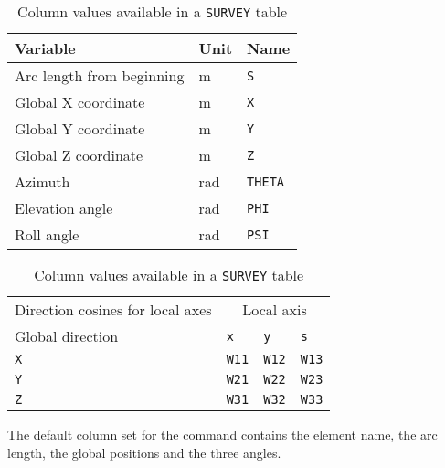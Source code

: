 \begin{table}[Ht] \footnotesize
  \begin{center}
    \caption{Column values available in a \texttt{SURVEY} table}
    \label{tab:survey_col}
    \begin{tabular}{|l|l|l|}
      \hline
      Variable & Unit & Name \\
      \hline
      Arc length from beginning & m & \texttt{S}\index{S} \\
      Global X coordinate & m & \texttt{X}\index{X} \\
      Global Y coordinate & m & \texttt{Y}\index{Y} \\
      Global Z coordinate  & m & \texttt{Z}\index{Z} \\
      Azimuth & rad & \texttt{THETA}\index{THETA} \\
      Elevation angle & rad & \texttt{PHI}\index{PHI} \\
      Roll angle & rad & \texttt{PSI}\index{PSI} \\
      \hline
    \end{tabular}

    \begin{tabular}{|l|l|l|l|}
      \hline
      Direction cosines for local axes & \multicolumn{3}{c|}{Local axis} \\
      Global direction & \texttt{x} & \texttt{y} & \texttt{s} \\
      \hline
      \texttt{X} & \texttt{W11}\index{W11} &
      \texttt{W12}\index{W12} & \texttt{W13}\index{W13} \\
      \texttt{Y} & \texttt{W21}\index{W21} &
      \texttt{W22}\index{W22} & \texttt{W23}\index{W23} \\
      \texttt{Z} & \texttt{W31}\index{W31} &
      \texttt{W32}\index{W32} & \texttt{W33}\index{W33} \\
      \hline
    \end{tabular}
  \end{center}
\end{table}
\clearpage
The default column set for the command
 contains the element name,
the arc length, the global positions and the three angles.

